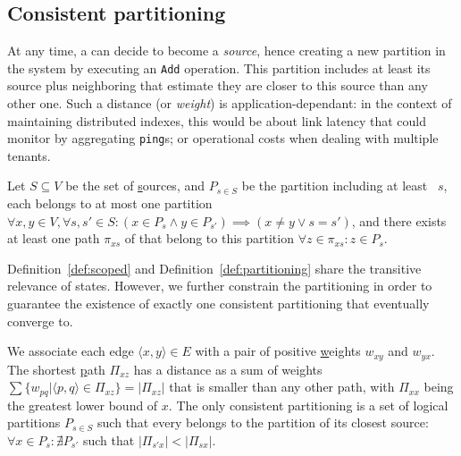 

\subsection{Consistent partitioning}
\label{subsec:consistent}

At any time, a \process can decide to become a \emph{source}, hence
creating a new partition in the system by executing an \texttt{Add}
operation. This partition includes at least its source plus
neighboring \processes that estimate they are closer to this source
than any other one. Such a distance (or \emph{weight}) is
application-dependant: in the context of maintaining distributed
indexes, this would be about link latency that \nodes could monitor by
aggregating \texttt{ping}s; or operational costs when dealing with
multiple tenants.



\begin{definition}
  Let $S \subseteq V$ be the set of \underline{s}ources, and $P_{s\in
    S}$ be the \underline{p}artition including at least \Process~$s$,
  each \process belongs to at most one partition $\forall x, y \in V,
  \forall s,s' \in S: (x \in P_{s} \wedge y \in P_{s'}) \implies (x \neq
  y \vee s = s')$, and there exists at least one path $\pi_{xs}$ of
  \processes that belong to this partition $\forall z \in \pi_{xs}: z
  \in P_s$.
\end{definition}

Definition~\ref{def:scoped} and Definition~\ref{def:partitioning}
share the transitive relevance of \process states. However, we further
constrain the partitioning in order to guarantee the existence of
exactly one consistent partitioning that \processes eventually converge
to.

\begin{definition}
  We associate each edge $\langle x, y \rangle \in E$ with a pair of
  positive \underline{w}eights $w_{xy}$ and $w_{yx}$. The shortest
  \underline{p}ath $\Pi_{xz}$ has a distance as a sum of weights
  $\sum\{w_{pq} | \langle p, q \rangle \in \Pi_{xz}\} = |\Pi_{xz}|$
  that is smaller than any other path, with $\Pi_{xx}$ being the
  greatest lower bound of $x$. The only consistent partitioning is a
  set of logical partitions $P_{s\in S}$ such that every \process
  belongs to the partition of its closest source:
  $\forall x \in P_{s}: \nexists P_{s'}$ such that
  $|\Pi_{s'x}| < |\Pi_{sx}|$.
\end{definition}

